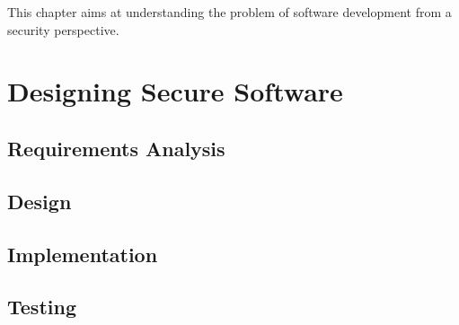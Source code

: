 This chapter aims at understanding the problem of software development from a security perspective. 

\section{Designing Secure Software}

\subsection{Requirements Analysis}

\subsection{Design}

\subsection{Implementation}

\subsection{Testing}
